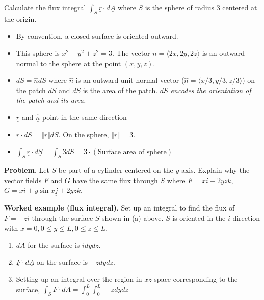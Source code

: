 \documentclass[12pt,letterpaper,noanswers]{exam}
\newcommand{\mb}[1]{\underline{#1}}
\begin{document}
Calculate the flux integral $\displaystyle \int_S \mb r\cdot d\mb A$ where $S$ is the sphere of radius $3$ centered at the origin.
\begin{itemize}
    \item By convention, a closed surface is oriented outward.
    \item This sphere is $x^2+y^2+z^2 = 3$.  The vector $\underline n = \langle 2x,2y,2z\rangle$ is an outward normal to the sphere at the point $(x,y,z)$.
    \item $d \mb S = \hat{\underline n} dS$ where $\hat{\underline n}$ is an outward unit normal vector ($\hat{\underline n} = \langle x/3,y/3,z/3\rangle$) on the patch $d \mb S$ and $d S$ is the area of the patch.  \emph{$d\underline S$ encodes the orientation of the patch and its area.}
    \item $\mb r$ and $\hat{\underline n}$ point in the same direction
    \item $\mb r\cdot d\mb S = \Vert \mb r\Vert d S$.  On the sphere, $\Vert \mb r\Vert = 3$.
    \item $\displaystyle \int_S \mb r\cdot d\mb S =\int_S 3 dS =  3\cdot(\text{Surface area of sphere})$
\end{itemize}
\vspace{2.5in}

\noindent\textbf{Problem}.  Let $S$ be part of a cylinder centered on the $y$-axis.  Explain why the vector fields $\mb F$ and $\mb G$ have the same flux through $S$ where $\displaystyle \mb F = x\mb i + 2yz\mb k$, $\displaystyle \mb G = x\mb i + y\sin x\mb j + 2yz\mb k$.


\vspace{1.5in}

\noindent\textbf{Worked example (flux integral)}.  Set up an integral to find the flux of $\mb F = -z\mb i$ through the surface $S$ shown in (a) above.  $S$ is oriented in the $\mb i$ direction with $x = 0, 0\leq y\leq L, 0\leq z\leq L$.

\begin{enumerate}
\itemsep0em
    \item $d\mb A$ for the surface is $\mb i dydz$.
    \item $\mb F\cdot d\mb A$ on the surface is $-zdydz$.
    \item Setting up an integral over the region in $xz$-space corresponding to the surface, $\int_S \mb F\cdot d\mb A = \int_0^L\int_0^L -z dy dz$
\end{enumerate}


\vfill
\end{document}
